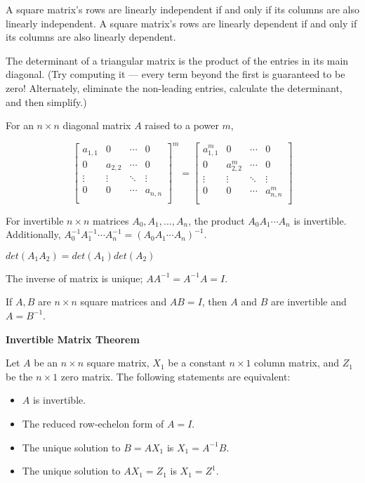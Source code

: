 \documentclass[12pt]{article}
\begin{document}
	
	
	A square matrix's rows are linearly independent if and only if its columns are also linearly independent. A square matrix's rows are linearly dependent if and only if its columns are also linearly dependent.
	
	The determinant of a triangular matrix is the product of the entries in its main diagonal. (Try computing it — every term beyond the first is guaranteed to be zero! Alternately, eliminate the non-leading entries, calculate the determinant, and then simplify.)
	
	For an $n \times n$ diagonal matrix $A$ raised to a power $m$,	
	
	$$
	\begin{bmatrix}
	a_{1,1} & 0       & \cdots & 0     \\
	0       & a_{2,2} & \cdots & 0     \\
	\vdots  & \vdots  & \ddots & \vdots\\
	0       & 0       & \cdots & a_{n,n}\\
	\end{bmatrix}^{m}	
	=
	\begin{bmatrix}
	a_{1,1}^{m} & 0           & \cdots & 0          \\
	0           & a_{2,2}^{m} & \cdots & 0          \\
	\vdots      & \vdots      & \ddots & \vdots     \\
	0           & 0           & \cdots & a_{n,n}^{m}\\
	\end{bmatrix}$$
	
	
	For invertible $n \times n$ matrices $A_{0}, A_{1}, ..., A_{n}$, the product $A_{0}A_{1}\cdots A_{n}$ is invertible. Additionally, $A_{0}^{-1}A_{1}^{-1}\cdots A_{n}^{-1}=(A_{0}A_{1}\cdots A_{n})^{-1}$.
	
	$det(A_{1}A_{2})=det(A_{1})det(A_{2})$
	
	The inverse of matrix is unique; $AA^{-1}=A^{-1}A=I$.
	
	If $A,B$ are $n \times n$ square matrices and $AB=I$, then $A$ and $B$ are invertible and $A=B^{-1}$.	
	
	

	\textbf{Invertible Matrix Theorem}
	
	Let $A$ be an $n\times n$ square matrix, $X_{1}$ be a constant $n\times 1$ column matrix, and $Z_{1}$ be the $n\times 1$ zero matrix. The following statements are equivalent:
	
	\begin{itemize}
	\item $A$ is invertible.
	\item The reduced row-echelon form of $A=I$.
	\item The unique solution to $B=AX_{1}$ is $X_{1}=A^{-1}B$.
	\item The unique solution to $AX_{1}=Z_{1}$ is $X_{1}=Z^{1}$.
	\end{itemize}
\end{document}

